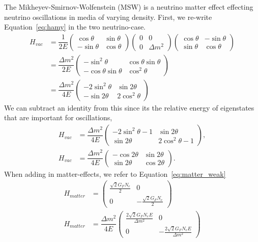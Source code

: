 \documentclass[main.tex]{subfiles}
\begin{document}
The Mikheyev-Smirnov-Wolfenstein (MSW) is a neutrino matter effect effecting neutrino oscillations in media of varying density. 
First, we re-write Equation~\eqref{eq:hamy} in the two neutrino-case. 
\begin{align}
    H_{vac} &= \dfrac{1}{2E}\left(\begin{array}{cc}\cos\theta &\sin\theta \\ -\sin\theta & \cos\theta\end{array}\right)\left(\begin{array}{cc}0 & 0 \\ 0 & \Delta m^{2}\end{array}\right) \left(\begin{array}{cc}\cos\theta &-\sin\theta \\ \sin\theta & \cos\theta\end{array}\right) \\
    &= \dfrac{\Delta m^{2}}{2E}\left(\begin{array}{cc} -\sin^{2}\theta & \cos\theta\sin\theta \\ -\cos\theta \sin\theta & \cos^{2}\theta\end{array}\right)\\
    &= \dfrac{\Delta m^{2}}{4E}\left(\begin{array}{cc} -2\sin^{2}\theta & \sin 2\theta \\ -\sin 2\theta & 2\cos^{2}\theta\end{array}\right)
\end{align}
We can subtract an identity from this since its the relative energy of eigenstates that are important for oscillations,
\begin{align}
    H_{vac}  &= \dfrac{\Delta m^{2}}{4E}\left(\begin{array}{cc} -2\sin^{2}\theta-1 & \sin 2\theta \\ \sin 2\theta & 2\cos^{2}\theta -1\end{array}\right),\\
    H_{vac} &= \dfrac{\Delta m^{2}}{4E}\left(\begin{array}{cc} -\cos 2\theta & \sin 2\theta \\ \sin 2\theta & \cos 2\theta \end{array}\right). \label{eq:vacuum_msw}
\end{align}
When adding in matter-effects, we refer to Equation~\eqref{eq:matter_weak}
\begin{align}
    H_{matter} &= \left(\begin{array}{cc} \tfrac{\sqrt{2}G_{F}N_{e}}{2} & 0 \\ 0 & -\tfrac{\sqrt{2}G_{F}N_{e}}{2} \end{array}\right)\\
    H_{matter} &= \dfrac{\Delta m^{2}}{4E}\left(\begin{array}{cc} \tfrac{2\sqrt{2}G_{F}N_{e}E}{\Delta m^{2}} & 0 \\ 0 & - \tfrac{2\sqrt{2}G_{F}N_{e}E}{\Delta m^{2}} \end{array}\right) \label{eq:matter_only}
\end{align}
\end{document}
